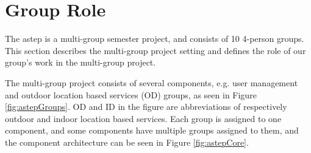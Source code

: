 \chapter{Group Role}
The \gls{astep} is a multi-group semester project, and consists of 10 4-person groups. 
This section describes the multi-group project setting and defines the role of our group’s work in the multi-group project.


The multi-group project consists of several components, e.g. user management and outdoor location based services (OD) groups, as seen in Figure \ref{fig:astepGroups}.
OD and ID in the figure are abbreviations of respectively outdoor and indoor location based services.
Each group is assigned to one component, and some components have multiple groups assigned to them, and the component architecture can be seen in Figure \ref{fig:astepCore}.


